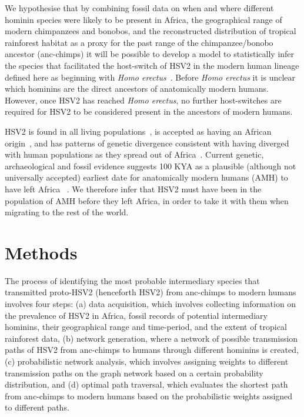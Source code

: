 \documentclass[fleqn,10pt]{wlscirep}
\begin{document}
We hypothesise that by combining fossil data on when and where different hominin species were likely to be present in Africa, the geographical range of modern chimpanzees and bonobos, and the reconstructed distribution of tropical rainforest habitat as a proxy for the past range of the chimpanzee/bonobo ancestor (anc-chimps) it will be possible to develop a model to statistically infer the species that facilitated the host-switch of HSV2 in the modern human lineage defined here as beginning with \textit{Homo erectus}~\citep{Anton2016}. Before \textit{Homo erectus} it is unclear which hominins are the direct ancestors of anatomically modern humans. However, once HSV2 has reached \textit{Homo erectus}, no further host-switches are required for HSV2 to be considered present in the ancestors of modern humans.

HSV2 is found in all living populations~\citep{Looker2015}, is accepted as having an African origin~\citep{Koelle2017, Burrel2017}, and has patterns of genetic divergence consistent with having diverged with human populations as they spread out of Africa~\citep{Koelle2017}. Current genetic, archaeological and fossil evidence suggests 100 KYA as a plausible (although not universally accepted) earliest date for anatomically modern humans (AMH) to have left Africa ~\cite{MirazonLahr2016}. We therefore infer that HSV2 must have been in the population of AMH before they left Africa, in order to take it with them when migrating to the rest of the world.

\section*{Methods}

The process of identifying the most probable intermediary species that transmitted proto-HSV2 (henceforth HSV2) from anc-chimps to modern humans involves four steps: (a) data acquisition, which involves collecting information on the prevalence of HSV2 in Africa, fossil records of potential intermediary hominins, their geographical range and time-period, and the extent of tropical rainforest data, (b) network generation, where a network of possible transmission paths of HSV2 from anc-chimps to humans through different hominins is created, (c) probabilistic network analysis, which involves assigning weights to different transmission paths on the graph network based on a certain probability distribution, and (d) optimal path traversal, which evaluates the shortest path from anc-chimps to modern humans based on the probabilistic weights assigned to different paths.
\end{document}
